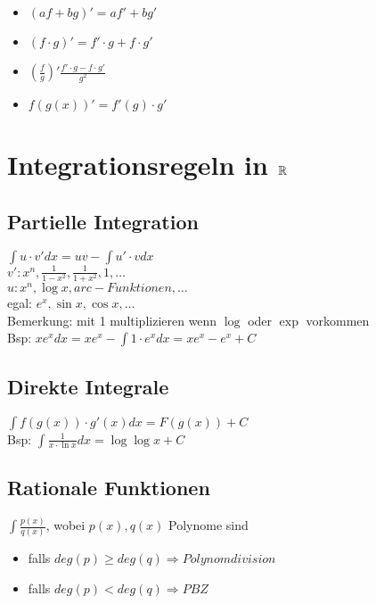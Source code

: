     \begin{itemize}
        \item $(af + bg)' = af' + bg'$ 
        \item $(f \cdot g)' = f'\cdot g + f \cdot g'$
        \item $(\frac{f}{g})' \frac{f'\cdot g - f \cdot g'}{g^2}$
        \item $f(g(x))' = f'(g) \cdot g'$
    \end{itemize}
    
    \section{Integrationsregeln in $\mathbb{R}$}
    
    \subsection{Partielle Integration}
    
    $\int u \cdot v' dx = uv - \int u' \cdot v dx$ \\
    $v': x^n, \frac{1}{1-x^2}, \frac{1}{1+x^2}, 1, \dots$ \\
    $u : x^n, \log x, arc-Funktionen, \dots$ \\
    egal: $e^x, \sin x, \cos x, \dots$ \\
    Bemerkung: mit 1 multiplizieren wenn $\log$ oder $\exp$ vorkommen \\
    Bsp: $xe^x dx = xe^x - \int 1 \cdot e^x dx = xe^x - e^x + C$
    
    \subsection{Direkte Integrale}
    
    $\int f(g(x)) \cdot g'(x) dx = F(g(x)) + C$ \\
    Bsp: $\int \frac{1}{x\cdot \ln x} dx = \log\log x + C$
    
    \subsection{Rationale Funktionen}
    
    $\int \frac{p(x)}{q(x)}$, wobei $p(x), q(x)$ Polynome sind \\
    \begin{itemize}
        \item falls $deg(p) \geq deg(q) \Longrightarrow Polynomdivision$ \\
        \item falls $deg(p) < deg(q) \Longrightarrow PBZ$
    \end{itemize}
    
